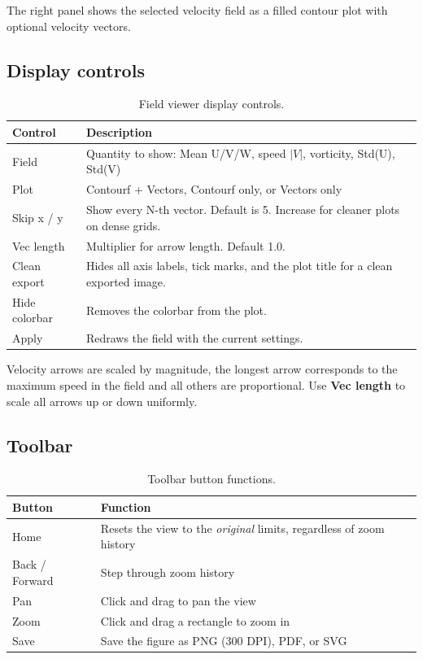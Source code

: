 \documentclass[11pt, a4paper]{report}
\newcommand{\uipth}[1]{\textbf{\textcolor{upblue}{#1}}}
\begin{document}
The right panel shows the selected velocity field as a filled contour plot with optional velocity vectors.

\subsection{Display controls}

\begin{table}[htbp]
\centering
\caption{Field viewer display controls.}
\begin{tabular}{lp{9cm}}
\toprule
\textbf{Control} & \textbf{Description} \\
\midrule
Field         & Quantity to show: Mean U/V/W, speed $|V|$, vorticity, Std(U), Std(V) \\
Plot          & Contourf + Vectors, Contourf only, or Vectors only \\
Skip x / y    & Show every N-th vector. Default is 5. Increase for cleaner plots on dense grids. \\
Vec length    & Multiplier for arrow length. Default 1.0. \\
Clean export  & Hides all axis labels, tick marks, and the plot title for a clean exported image. \\
Hide colorbar & Removes the colorbar from the plot. \\
Apply         & Redraws the field with the current settings. \\
\bottomrule
\end{tabular}
\end{table}

\begin{tipbox}
Velocity arrows are scaled by magnitude, the longest arrow corresponds to the maximum speed in the field and all others are proportional. Use \uipth{Vec length} to scale all arrows up or down uniformly.
\end{tipbox}

\subsection{Toolbar}

\begin{table}[htbp]
\centering
\caption{Toolbar button functions.}
\begin{tabular}{ll}
\toprule
\textbf{Button} & \textbf{Function} \\
\midrule
Home           & Resets the view to the \emph{original} limits, regardless of zoom history \\
Back / Forward & Step through zoom history \\
Pan            & Click and drag to pan the view \\
Zoom           & Click and drag a rectangle to zoom in \\
Save           & Save the figure as PNG (300 DPI), PDF, or SVG \\
\bottomrule
\end{tabular}
\end{table}
\end{document}
